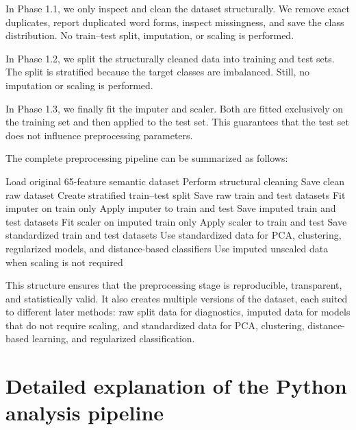 \documentclass{ipgpmaster}
\begin{document}
In Phase 1.1, we only inspect and clean the dataset structurally. We remove exact duplicates, report duplicated word forms, inspect missingness, and save the class distribution. No train--test split, imputation, or scaling is performed.

In Phase 1.2, we split the structurally cleaned data into training and test sets. The split is stratified because the target classes are imbalanced. Still, no imputation or scaling is performed.

In Phase 1.3, we finally fit the imputer and scaler. Both are fitted exclusively on the training set and then applied to the test set. This guarantees that the test set does not influence preprocessing parameters.

The complete preprocessing pipeline can be summarized as follows:

\begin{algorithm}[H]
\caption{Complete preprocessing workflow}
\begin{algorithmic}[1]
\State Load original 65-feature semantic dataset
\State Perform structural cleaning
\State Save clean raw dataset
\State Create stratified train--test split
\State Save raw train and test datasets
\State Fit imputer on train only
\State Apply imputer to train and test
\State Save imputed train and test datasets
\State Fit scaler on imputed train only
\State Apply scaler to train and test
\State Save standardized train and test datasets
\State Use standardized data for PCA, clustering, regularized models, and distance-based classifiers
\State Use imputed unscaled data when scaling is not required
\end{algorithmic}
\end{algorithm}

This structure ensures that the preprocessing stage is reproducible, transparent, and statistically valid. It also creates multiple versions of the dataset, each suited to different later methods: raw split data for diagnostics, imputed data for models that do not require scaling, and standardized data for PCA, clustering, distance-based learning, and regularized classification.

\section{Detailed explanation of the Python analysis pipeline}
\end{document}
